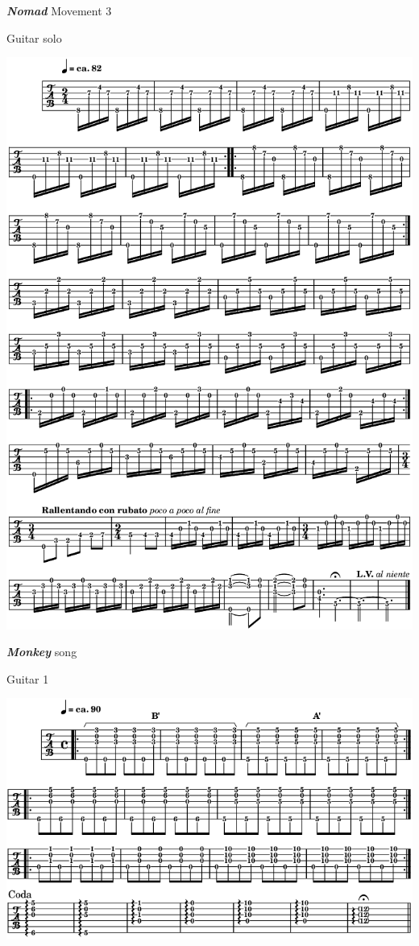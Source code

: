 \newpage

 \textbf{\textsl{Nomad}} Movement 3 

\smallskip

 \quad Guitar solo

\begin{center}
\includegraphics[width=\textwidth]{img/neC1}
\end{center}

\newpage

\textbf{\textsl{Monkey}} song  

\bigskip

 \quad Guitar 1

\begin{center}
\includegraphics[width=\textwidth]{img/neE1}
\end{center}

